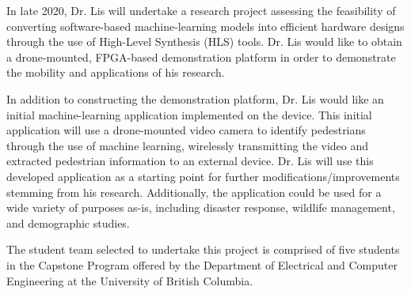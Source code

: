 In late 2020, Dr. Lis will undertake a research project assessing the feasibility of converting software-based machine-learning models into efficient hardware designs through the use of High-Level Synthesis (HLS) tools. Dr. Lis would like to obtain a drone-mounted, FPGA-based demonstration platform in order to demonstrate the mobility and applications of his research. 

In addition to constructing the demonstration platform, Dr. Lis would like an initial machine-learning application implemented on the device. This initial application will use a drone-mounted video camera to identify pedestrians through the use of machine learning, wirelessly transmitting the video and extracted pedestrian information to an external device. Dr. Lis will use this developed application as a starting point for further modifications/improvements stemming from his research. Additionally, the application could be used for a wide variety of purposes as-is, including disaster response, wildlife management, and demographic studies.

The student team selected to undertake this project is comprised of five students in the Capstone Program offered by the Department of Electrical and Computer Engineering at the University of British Columbia.